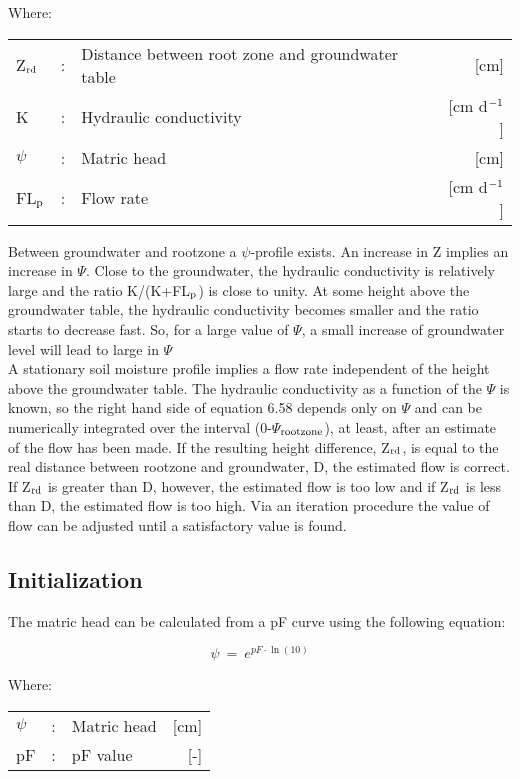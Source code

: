 Where:\\[5pt]
\begin{tabularx}{\textwidth}{llXr}
Z$_{{\rm rd}}$ &:& Distance between root zone and groundwater table  & [cm]\\
K &:& Hydraulic conductivity  & [cm d$^{{\rm -1}}$]\\
$\psi$ &:& Matric head  & [cm]\\
FL$_{{\rm p}}$ &:& Flow rate  & [cm d$^{{\rm -1}}$]\\
\end{tabularx}

Between groundwater and rootzone a $\psi$-profile exists. An increase in Z implies an
increase in $\Psi$. Close to the groundwater, the hydraulic conductivity is relatively large and
the ratio K/(K+FL$_{{\rm p}}$) is close to unity. At some height above the groundwater table, the
hydraulic conductivity becomes smaller and the ratio starts to decrease fast. So, for a
large value of $\Psi$, a small increase of groundwater level will lead to large in $\Psi$\\
A stationary soil moisture profile implies a flow rate independent of the height above the
groundwater table. The hydraulic conductivity as a function of the $\Psi$ is known, so the
right hand side of equation 6.58 depends only on $\Psi$ and can be numerically integrated
over the interval (0-$\Psi$$_{{\rm rootzone}}$), at least, after an estimate of the flow has been made. If the
resulting height difference, Z$_{{\rm rd}}$, is equal to the real distance between rootzone and
groundwater, D, the estimated flow is correct. If Z$_{{\rm rd}}$ is greater than D, however, the
estimated flow is too low and if Z$_{{\rm rd}}$ is less than D, the estimated flow is too high. Via an
iteration procedure the value of flow can be adjusted until a satisfactory value is found.

\subsection{Initialization}
The matric head can be calculated from a pF curve using the following equation:

\begin{equation}
\psi ~=~e ^{pF \cdot \ln(10)} 
\end{equation}

Where:\\[5pt]
\begin{tabularx}{\textwidth}{llXr}
$\psi$ &:& Matric head  & [cm]\\
pF &:& pF value  & [-]\\
\end{tabularx}

